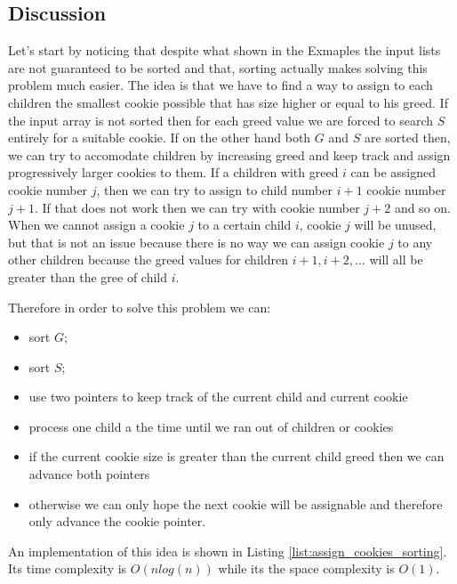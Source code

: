 \subsection{Discussion}
Let's start by noticing that despite what shown in the Exmaples the input lists are not guaranteed to be sorted and that, sorting actually makes solving this problem much easier.
The idea is that we have to find a way to assign to each children the smallest cookie possible that has size higher or equal to his greed. If the input array is not sorted then for each greed value we are forced to search $S$ entirely for a suitable cookie. 
If on the other hand both $G$ and $S$ are sorted then, we can try to accomodate children by increasing greed and keep track and assign progressively larger cookies to them. 
If a children with greed $i$ can be assigned cookie number $j$, then we can try to assign to child number $i+1$ cookie number $j+1$. If that does not work then we can try with cookie number $j+2$ and so on.
When we cannot assign a cookie $j$ to a certain child $i$, cookie $j$ will be unused, but that is not an issue because there is no way we can assign cookie $j$ to any other children because the greed values for children $i+1, i+2, \ldots$  will all be greater than the gree of child $i$.

Therefore in order to solve this problem we can:
\begin{itemize}
    \item sort $G$;
    \item sort $S$;
    \item use two pointers to keep track of the current child and current cookie
    \item process one child a the time until we ran out of children or cookies
    \item if the current cookie size is greater than the current child greed then we can advance both pointers
    \item otherwise we can only hope the next cookie will be assignable and therefore only advance the cookie pointer.
\end{itemize}

An implementation of this idea is shown in Listing \ref{list:assign_cookies_sorting}. Its time complexity is $O(nlog(n))$ while its the space complexity is $O(1)$.



